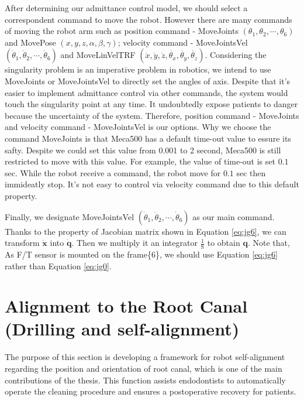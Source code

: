 After determining our admittance control model, we should select a correspondent command to move the robot. However there are many commands of moving the robot arm such as position command - MoveJoints $\left(\theta _1, \theta _2,\cdots , \theta _6 \right)$ and MovePose $\left(x,y,z,\alpha ,\beta ,\gamma \right)$; velocity command - MoveJointsVel $\left(\dot{\theta}_1, \dot{\theta}_2,\cdots , \dot{\theta}_6 \right)$ and MoveLinVelTRF $\left(\dot{x},\dot{y},\dot{z},\dot{\theta _x},\dot{\theta _y},\dot{\theta _z}\right)$. Considering the singularity problem is an imperative problem in robotics, we intend to use MoveJoints or MoveJointsVel to directly set the angles of axis. Despite that it's easier to implement admittance control via other commands, the system would touch the singularity point at any time. It undoubtedly expose patients to danger because the uncertainty of the system. Therefore, position command - MoveJoints and velocity command - MoveJointsVel is our options. Why we choose the command MoveJoints  is that Meca500 has a default time-out value to essure its safty. Despite we could set this value from 0.001 to 2 second, Meca500 is still restricted to move with this value. For example, the value of time-out is set $0.1$ sec. While the robot receive a command, the robot move for $0.1$ sec then immideatly stop. It's not easy to control via velocity command due to this default property.

Finally, we designate MoveJointsVel $\left(\dot{\theta}_1, \dot{\theta}_2,\cdots , \dot{\theta}_6 \right)$ as our main command. Thanks to the property of Jacobian matrix shown in Equation \ref{eq:jg6}, we can transform $\boldsymbol{\dot{x}}$ into $\boldsymbol{\dot{q}}$. Then we multiply it an integrator $\frac{1}{\mathrm{S}}$
to obtain $\boldsymbol{q}$. Note that, As F/T sensor is mounted on the frame\{6\}, we should use Equation \ref{eq:jg6} rather than Equation \ref{eq:jg0}. 
\section{Alignment to the Root Canal (Drilling and self-alignment)}
The purpose of this section is developing a framework for robot self-alignment regarding the position and orientation of root canal, which is one of the main contributions of the thesis. This function assists endodontists to automatically operate the cleaning procedure and ensures a postoperative recovery for patients.

